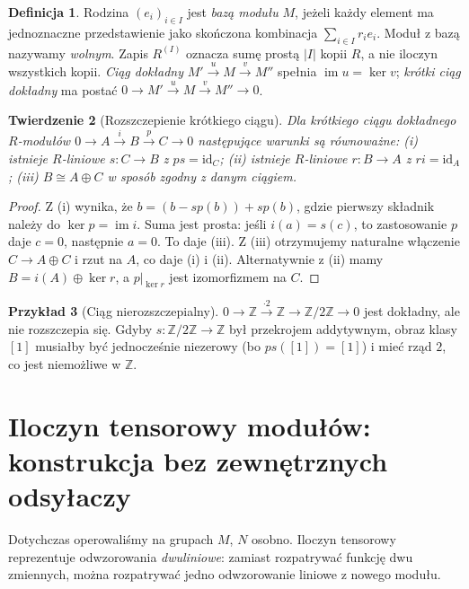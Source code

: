 \documentclass[11pt,a4paper,oneside]{report}
\newcommand{\Z}{\mathbb{Z}}
\newcommand{\id}{\mathrm{id}}
\theoremstyle{plain}
\newtheorem{twierdzenie}{Twierdzenie}[section]
\theoremstyle{definition}
\newtheorem{definicja}[twierdzenie]{Definicja}
\newtheorem{przyklad}[twierdzenie]{Przykład}
\theoremstyle{remark}
\begin{document}
\begin{definicja}
Rodzina $(e_i)_{i\in I}$ jest \emph{bazą modułu} $M$,
jeżeli każdy element ma jednoznaczne przedstawienie jako
skończona kombinacja $\sum_{i\in I}r_ie_i$.
Moduł z bazą nazywamy \emph{wolnym}. Zapis $R^{(I)}$
oznacza sumę prostą $|I|$ kopii $R$, a nie iloczyn wszystkich
kopii. \emph{Ciąg dokładny} $M'\xrightarrow{u}M\xrightarrow{v}M''$
spełnia $\operatorname{im}u=\ker v$; \emph{krótki ciąg dokładny}
ma postać $0\to M'\xrightarrow{u}M\xrightarrow{v}M''\to0$.
\end{definicja}
\begin{twierdzenie}[Rozszczepienie krótkiego ciągu]
Dla krótkiego ciągu dokładnego $R$-modułów
$0\to A\xrightarrow{i}B\xrightarrow{p}C\to0$
następujące warunki są równoważne:
(i) istnieje $R$-liniowe $s:C\to B$ z $ps=\id_C$;
(ii) istnieje $R$-liniowe $r:B\to A$ z $ri=\id_A$;
(iii) $B\cong A\oplus C$ w sposób zgodny z danym ciągiem.
\end{twierdzenie}
\begin{proof}
Z (i) wynika, że $b=(b-sp(b))+sp(b)$, gdzie pierwszy
składnik należy do $\ker p=\operatorname{im}i$.
Suma jest prosta: jeśli $i(a)=s(c)$, to zastosowanie $p$
daje $c=0$, następnie $a=0$. To daje (iii).
Z (iii) otrzymujemy naturalne włączenie $C\to A\oplus C$
i rzut na $A$, co daje (i) i (ii). Alternatywnie z (ii) mamy
$B=i(A)\oplus\ker r$, a $p|_{\ker r}$ jest izomorfizmem na $C$.
\end{proof}
\begin{przyklad}[Ciąg nierozszczepialny]
$0\to\Z\xrightarrow{\cdot 2}\Z\to\Z/2\Z\to0$
jest dokładny, ale nie rozszczepia się. Gdyby $s:\Z/2\Z\to\Z$
był przekrojem addytywnym, obraz klasy $[1]$ musiałby być
jednocześnie niezerowy (bo $ps([1])=[1]$) i mieć rząd $2$,
co jest niemożliwe w $\Z$.
\end{przyklad}


\section{Iloczyn tensorowy modułów: konstrukcja bez zewnętrznych odsyłaczy}
\label{sec:tensor-algebra-v5}
Dotychczas operowaliśmy na grupach $M$, $N$ osobno. Iloczyn
tensorowy reprezentuje odwzorowania \emph{dwuliniowe}:
zamiast rozpatrywać funkcję dwu zmiennych, można rozpatrywać
jedno odwzorowanie liniowe z nowego modułu.
\end{document}
